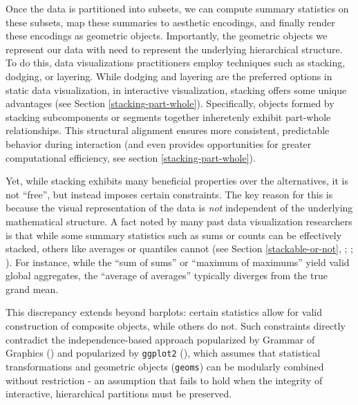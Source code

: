 \documentclass[
  openany]{book}
\theoremstyle{definition}
\theoremstyle{definition}
\theoremstyle{definition}
\theoremstyle{definition}
\theoremstyle{remark}
\begin{document}
Once the data is partitioned into subsets, we can compute summary statistics on these subsets, map these summaries to aesthetic encodings, and finally render these encodings as geometric objects. Importantly, the geometric objects we represent our data with need to represent the underlying hierarchical structure. To do this, data visualizations practitioners employ techniques such as stacking, dodging, or layering. While dodging and layering are the preferred options in static data visualization, in interactive visualization, stacking offers some unique advantages (see Section \ref{stacking-part-whole}). Specifically, objects formed by stacking subcomponents or segments together inheretenly exhibit part-whole relationships. This structural alignment ensures more consistent, predictable behavior during interaction (and even provides opportunities for greater computational efficiency, see section \ref{stacking-part-whole}).

Yet, while stacking exhibits many beneficial properties over the alternatives, it is not ``free'', but instead imposes certain constraints. The key reason for this is because the visual representation of the data is \emph{not} independent of the underlying mathematical structure. A fact noted by many past data visualization researchers is that while some summary statistics such as sums or counts can be effectively stacked, others like averages or quantiles cannot (see Section \ref{stackable-or-not}, ; ; ). For instance, while the ``sum of sums'' or ``maximum of maximums'' yield valid global aggregates, the ``average of averages'' typically diverges from the true grand mean.

This discrepancy extends beyond barplots: certain statistics allow for valid construction of composite objects, while others do not. Such constraints directly contradict the independence-based approach popularized by Grammar of Graphics () and popularized by \texttt{ggplot2} (), which assumes that statistical transformations and geometric objects (\texttt{geoms}) can be modularly combined without restriction - an assumption that fails to hold when the integrity of interactive, hierarchical partitions must be preserved.
\end{document}
